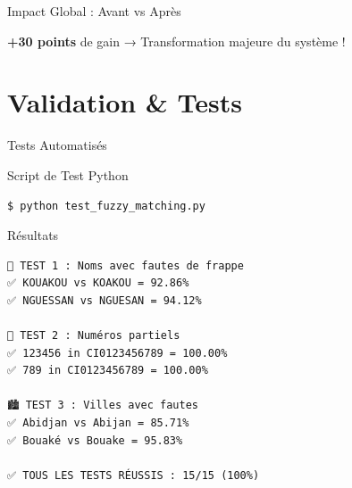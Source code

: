\documentclass[aspectratio=169]{beamer}
\begin{document}
\begin{frame}{Impact Global : Avant vs Après}
    \begin{center}
    \end{center}

    \vspace{0.5cm}

    \begin{block}{}
        \centering
        \Large \textbf{+30 points} de gain → Transformation majeure du système !
    \end{block}
\end{frame}

\section{Validation \& Tests}

\begin{frame}[fragile]{Tests Automatisés}
    \begin{block}{Script de Test Python}
        \small
\begin{lstlisting}[language=bash]
$ python test_fuzzy_matching.py
\end{lstlisting}
    \end{block}

    \begin{exampleblock}{Résultats}
        \small
\begin{verbatim}
📝 TEST 1 : Noms avec fautes de frappe
✅ KOUAKOU vs KOAKOU = 92.86%
✅ NGUESSAN vs NGUESAN = 94.12%

🔢 TEST 2 : Numéros partiels
✅ 123456 in CI0123456789 = 100.00%
✅ 789 in CI0123456789 = 100.00%

🏙️ TEST 3 : Villes avec fautes
✅ Abidjan vs Abijan = 85.71%
✅ Bouaké vs Bouake = 95.83%

✅ TOUS LES TESTS RÉUSSIS : 15/15 (100%)
\end{verbatim}
    \end{exampleblock}
\end{frame}
\end{document}
